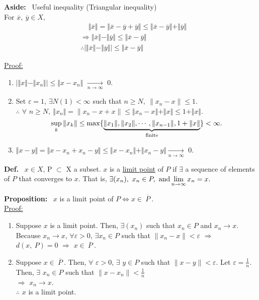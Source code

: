 \documentclass[letterpaper]{article}
\begin{document}
\noindent \textbf{Aside:}~ Useful inequality (Triangular inequality)\\
    For $\overline{x},\ \overline{y}\in X,$
    \begin{align*}
    &\ \ \ \ \ \Vert \overline{x} \Vert = \Vert \overline{x}-\overline{y}+\overline{y} \Vert \leq \Vert \overline{x}-\overline{y} \Vert + \Vert \overline{y} \Vert\\
        &\Rightarrow \Vert \overline{x} \Vert -\Vert \overline{y} \Vert \leq \Vert \overline{x}-\overline{y} \Vert\\
        &\therefore \vert \Vert \overline{x} \Vert - \Vert \overline{y} \Vert \vert \leq \Vert \overline{x}-\overline{y}\Vert
    \end{align*}

\noindent \underline{Proof:}
    \begin{enumerate}
        \item $\vert \Vert x \Vert - \Vert x_n\Vert\vert \leq \Vert x-x_n\Vert$ $\xrightarrow[n \to \infty]{}$ 0.
        \item Set $\varepsilon = 1$, $\exists N(1) <\infty$ such that $n \geq N,\ \|x_n-x\| \leq 1$.\\
            $\therefore$ $\forall$ $n \geq N,\ \Vert x_n\Vert =\|x_n-x+x\| \leq \Vert x_n - x\Vert + \Vert x \Vert \leq 1+\Vert x \Vert.$
            \begin{equation*}
                \sup\limits_{k}\Vert x_k\Vert \leq \operatorname{max}\{\underbrace{\Vert x_1\Vert, \Vert x_2\Vert, \dotsb , \Vert x_{n-1}\Vert, 1+ \Vert x \Vert}_\textnormal{finite}\}<\infty.
            \end{equation*}
        \item $\Vert x-y\Vert = \Vert x-x_n +x_n-y\Vert \leq \Vert x-x_n\Vert + \Vert x_n -y\Vert \xrightarrow[n \to \infty]{}$ 0.
    \end{enumerate}

\noindent \textbf{Def.}~ $x\in X$, P $\subset$ X a subset. $x$ is a \underline{limit point} of $P$ if $\exists$ a sequence of elements of $P$ that converges to $x$. That is, $\exists (x_n),\ x_n\in P,\ \textnormal{and} \lim\limits_{n \to \infty} x_n = x.$

\noindent \textbf{Proposition:}~ $x$ is a limit point of $P\Leftrightarrow x\in\overline{~P~}$.\\
    \underline{Proof:}
    \begin{enumerate}
        \item Suppose $x$ is a limit point. Then, $\exists (x_n)$ such that $x_n\in P$ and $x_n\rightarrow x$. Because $x_n\rightarrow x$, $\forall\varepsilon>0$, $\exists x_n\in P$ such that $\|x_n-x\|<\varepsilon$ $\Rightarrow$ $d(x,\ P)=0$ $\Rightarrow$ $x\in\overline{~P~}$.
        \item Suppose $x\in\overline{~P~}$. Then, $\forall$ $\varepsilon>0$, $\exists$ $y\in P$ such that $\|x-y\|<\varepsilon$. Let $\varepsilon=\frac{1}{n}$. Then, $\exists$ $x_n\in P$ such that $\|x-x_n\|<\frac{1}{n}$\\
        $\Rightarrow$ $x_n\rightarrow x$.\\
        $\therefore$ $x$ is a limit point.
    \end{enumerate}
\end{document}
